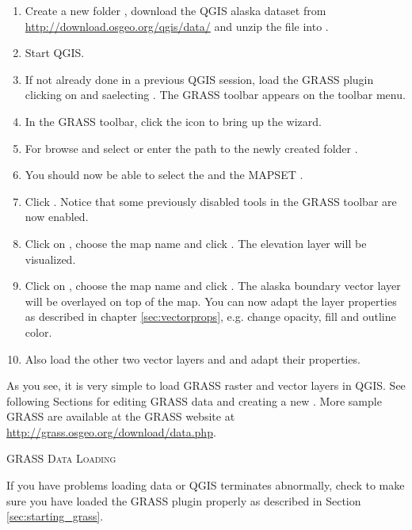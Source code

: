 \begin{enumerate}
 \item Create a new folder , download the QGIS alaska
  dataset  from
  \url{http://download.osgeo.org/qgis/data/} and unzip the file into
  .
  \item Start QGIS.
  \item If not already done in a previous QGIS session, load the GRASS plugin
  clicking on  \arrow {} and
  saelecting . The GRASS toolbar appears on the toolbar menu.
  \item In the GRASS toolbar, click the  icon to bring up the  wizard.
  \item For  browse and select or enter the path to the
  newly created folder .
  \item You should now be able to select the 
  and the MAPSET .
  \item Click . Notice that some previously disabled tools in the
  GRASS toolbar are now enabled.
  \item Click on ,
  choose the map name  and click . The elevation
  layer will be visualized.
  \item Click on ,
  choose the map name  and click . The alaska
  boundary vector layer will be overlayed on top of the  map. You can
  now adapt the layer properties as described in chapter \ref{sec:vectorprops},
  e.g. change opacity, fill and outline color.
  \item Also load the other two vector layers  and
   and adapt their properties.
\end{enumerate}

As you see, it is very simple to load GRASS raster and vector layers in QGIS.
See following Sections for editing GRASS data and creating a new
. More sample GRASS  are available at
the GRASS website at \url{http://grass.osgeo.org/download/data.php}.

\begin{Tip}\caption{\textsc{GRASS Data Loading}}
If you have problems loading data or QGIS terminates abnormally,
check to make sure you have loaded the GRASS plugin properly as described in
Section \ref{sec:starting_grass}.
\end{Tip}

